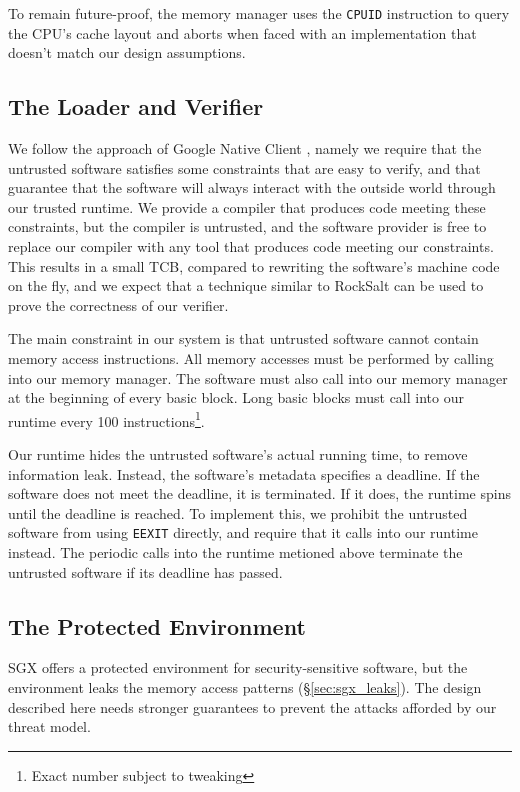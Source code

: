 To remain future-proof, the memory manager uses the \texttt{CPUID} instruction
\cite{intel2013manual} to query the CPU's cache layout and aborts when faced
with an implementation that doesn't match our design assumptions.


\subsection{The Loader and Verifier}

We follow the approach of Google Native Client \cite{yee2009native}
\cite{sehr2010adapting}, namely we require that the untrusted software
satisfies some constraints that are easy to verify, and that guarantee that the
software will always interact with the outside world through our trusted
runtime. We provide a compiler that produces code meeting these constraints,
but the compiler is untrusted, and the software provider is free to replace our
compiler with any tool that produces code meeting our constraints. This results
in a small TCB, compared to rewriting the software's machine code on the fly,
and we expect that a technique similar to RockSalt \cite{morrisett2012rocksalt}
can be used to prove the correctness of our verifier.

The main constraint in our system is that untrusted software cannot contain
memory access instructions. All memory accesses must be performed by calling
into our memory manager. The software must also call into our memory manager
at the beginning of every basic block. Long basic blocks must call into our
runtime every 100 instructions\footnote{Exact number subject to tweaking}.

Our runtime hides the untrusted software's actual running time, to remove
information leak. Instead, the software's metadata specifies a deadline.
If the software does not meet the deadline, it is terminated. If it does, the
runtime spins until the deadline is reached. To implement this, we prohibit the
untrusted software from using \texttt{EEXIT} directly, and require that it
calls into our runtime instead. The periodic calls into the runtime metioned
above terminate the untrusted software if its deadline has passed.


\subsection{The Protected Environment}

SGX offers a protected environment for security-sensitive software, but the
environment leaks the memory access patterns (\S \ref{sec:sgx_leaks}). The
design described here needs stronger guarantees to prevent the attacks afforded
by our threat model.

